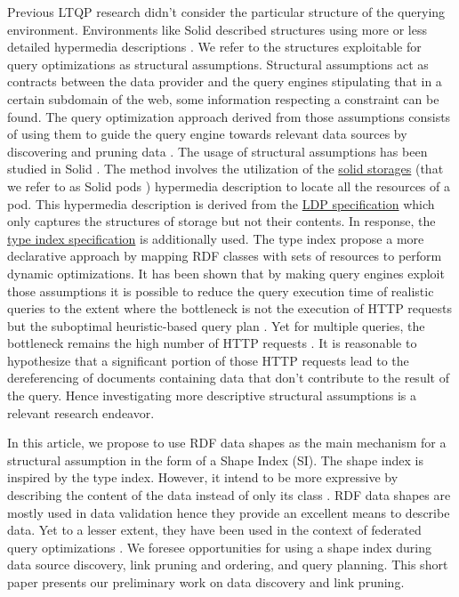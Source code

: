 Previous LTQP research didn't consider the particular structure of the querying environment.
Environments like Solid described structures using more or less detailed hypermedia descriptions \cite{Fielding}.
We refer to the structures exploitable for query optimizations as structural assumptions.
Structural assumptions act as contracts between the data provider and 
the query engines stipulating that in a certain subdomain of the web, some information respecting a constraint can be found.
The query optimization approach derived from those assumptions consists of using them to guide the query engine towards relevant data sources 
by discovering and pruning data \cite{verborgh2020guided}.
The usage of structural assumptions has been studied in Solid \cite{Taelman2023}.
The method involves the utilization of the 
\href{https://solidproject.org/TR/protocol#resources}{solid storages} (that we refer to as Solid pods \cite{Taelman2023}) hypermedia description
to locate all the resources of a pod. 
This hypermedia description is derived from the \href{https://www.w3.org/TR/ldp/}{LDP specification}
which only captures the structures of storage but not their contents.
In response, the \href{https://solid.github.io/type-indexes/}{type index specification} is additionally used.
The type index propose a more declarative approach \cite{Taelman2017} by mapping RDF classes with sets of resources to perform dynamic optimizations.
It has been shown that by making query engines exploit those assumptions it is possible to reduce the query execution time
of realistic queries to the extent where the bottleneck is not the execution of 
HTTP requests but the suboptimal heuristic-based query plan \cite{eschauzier_quweda_2023, Taelman2023}.
Yet for multiple queries, the bottleneck remains the high number of HTTP requests  \cite{eschauzier_quweda_2023}.
It is reasonable to hypothesize that a significant portion of those HTTP requests lead to the dereferencing of
documents containing data that don't contribute to the result of the query.
Hence investigating more descriptive structural assumptions is a relevant research endeavor.

In this article, we propose to use RDF data shapes as the main mechanism for a structural assumption in the form of a Shape Index (SI).
The shape index is inspired by the type index.
However, it intend to be more expressive by describing the content of the data instead of only its class \cite{Taelman2017}.
RDF data shapes are mostly used in data validation \cite{Gayo2018a} hence they provide an excellent means to describe data.
Yet to a lesser extent, they have been used in the context of federated query optimizations \cite{kashif2021}.
We foresee opportunities for using a shape index during data source discovery, link pruning and ordering, and query planning.
This short paper presents our preliminary work on data discovery and link pruning.